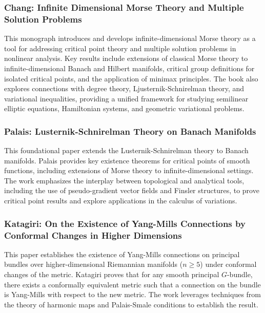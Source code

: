 \documentclass[10pt, letterpaper]{article}
\begin{document}
\subsubsection{Chang: Infinite Dimensional Morse Theory and Multiple Solution Problems \cite{chang1993morse}} 
This monograph introduces and develops infinite-dimensional Morse theory as a tool for addressing critical point theory and multiple solution problems in nonlinear analysis. Key results include extensions of classical Morse theory to infinite-dimensional Banach and Hilbert manifolds, critical group definitions for isolated critical points, and the application of minimax principles. The book also explores connections with degree theory, Ljusternik-Schnirelman theory, and variational inequalities, providing a unified framework for studying semilinear elliptic equations, Hamiltonian systems, and geometric variational problems.


\subsubsection{Palais: Lusternik-Schnirelman Theory on Banach Manifolds \cite{palais1966lusternik}} 
This foundational paper extends the Lusternik-Schnirelman theory to Banach manifolds. Palais provides key existence theorems for critical points of smooth functions, including extensions of Morse theory to infinite-dimensional settings. The work emphasizes the interplay between topological and analytical tools, including the use of pseudo-gradient vector fields and Finsler structures, to prove critical point results and explore applications in the calculus of variations.


\subsubsection{Katagiri: On the Existence of Yang-Mills Connections by Conformal Changes in Higher Dimensions \cite{katagiri1994existence}} 
This paper establishes the existence of Yang-Mills connections on principal bundles over higher-dimensional Riemannian manifolds (\(n \geq 5\)) under conformal changes of the metric. Katagiri proves that for any smooth principal \(G\)-bundle, there exists a conformally equivalent metric such that a connection on the bundle is Yang-Mills with respect to the new metric. The work leverages techniques from the theory of harmonic maps and Palais-Smale conditions to establish the result.
\end{document}
